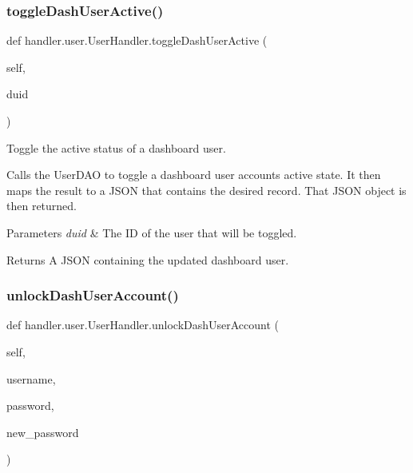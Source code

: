 \subsubsection{\texorpdfstring{toggle\+Dash\+User\+Active()}{toggleDashUserActive()}}
{\footnotesize\ttfamily def handler.\+user.\+User\+Handler.\+toggle\+Dash\+User\+Active (\begin{DoxyParamCaption}\item[{}]{self,  }\item[{}]{duid }\end{DoxyParamCaption})}



Toggle the active status of a dashboard user. 

Calls the User\+D\+AO to toggle a dashboard user account\textquotesingle{}s active state. It then maps the result to a J\+S\+ON that contains the desired record. That J\+S\+ON object is then returned.


\begin{DoxyParams}{Parameters}
{\em duid} & The ID of the user that will be toggled.\\
\hline
\end{DoxyParams}
\begin{DoxyReturn}{Returns}
A J\+S\+ON containing the updated dashboard user. 
\end{DoxyReturn}
\mbox{\label{classhandler_1_1user_1_1_user_handler_aa2de9a5da6421296215e75fafeb9b9d4}} 
\subsubsection{\texorpdfstring{unlock\+Dash\+User\+Account()}{unlockDashUserAccount()}}
{\footnotesize\ttfamily def handler.\+user.\+User\+Handler.\+unlock\+Dash\+User\+Account (\begin{DoxyParamCaption}\item[{}]{self,  }\item[{}]{username,  }\item[{}]{password,  }\item[{}]{new\+\_\+password }\end{DoxyParamCaption})}



